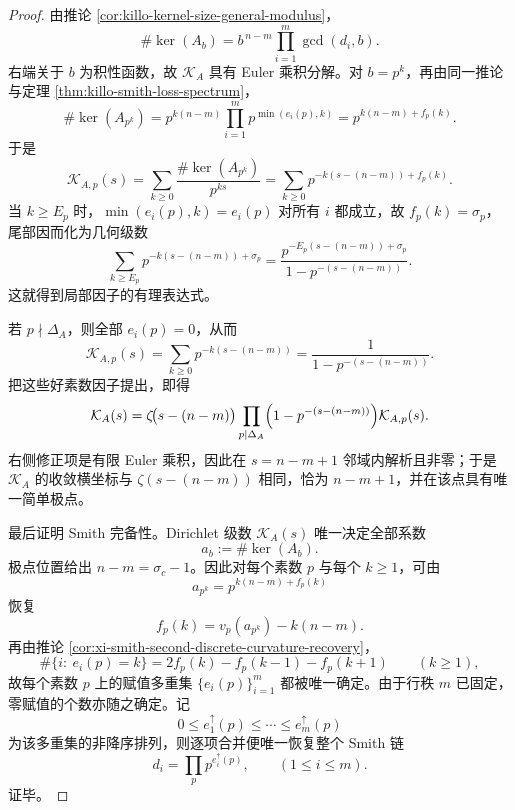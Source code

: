 \begin{proof}
由推论 \ref{cor:killo-kernel-size-general-modulus}，
\[
\#\ker(A_b)=b^{\,n-m}\prod_{i=1}^{m}\gcd(d_i,b).
\]
右端关于 \(b\) 为积性函数，故 \(\mathcal K_A\) 具有 Euler 乘积分解。对 \(b=p^k\)，再由同一推论与定理 \ref{thm:killo-smith-loss-spectrum}，
\[
\#\ker(A_{p^k})
=
p^{k(n-m)}\prod_{i=1}^{m}p^{\min(e_i(p),k)}
=
p^{k(n-m)+f_p(k)}.
\]
于是
\[
\mathcal K_{A,p}(s)
=
\sum_{k\ge 0}\frac{\#\ker(A_{p^k})}{p^{ks}}
=
\sum_{k\ge 0}p^{-k(s-(n-m))+f_p(k)}.
\]
当 \(k\ge E_p\) 时，\(\min(e_i(p),k)=e_i(p)\) 对所有 \(i\) 都成立，故 \(f_p(k)=\sigma_p\)，尾部因而化为几何级数
\[
\sum_{k\ge E_p}p^{-k(s-(n-m))+\sigma_p}
=
\frac{p^{-E_p(s-(n-m))+\sigma_p}}{1-p^{-(s-(n-m))}}.
\]
这就得到局部因子的有理表达式。

若 \(p\nmid \Delta_A\)，则全部 \(e_i(p)=0\)，从而
\[
\mathcal K_{A,p}(s)=\sum_{k\ge 0}p^{-k(s-(n-m))}
=
\frac{1}{1-p^{-(s-(n-m))}}.
\]
把这些好素数因子提出，即得
\[
\mathcal K_A(s)
=
\zeta\!\bigl(s-(n-m)\bigr)
\prod_{p\mid \Delta_A}
\Bigl(1-p^{-(s-(n-m))}\Bigr)\mathcal K_{A,p}(s).
\]
右侧修正项是有限 Euler 乘积，因此在 \(s=n-m+1\) 邻域内解析且非零；于是 \(\mathcal K_A\) 的收敛横坐标与 \(\zeta(s-(n-m))\) 相同，恰为 \(n-m+1\)，并在该点具有唯一简单极点。

最后证明 Smith 完备性。Dirichlet 级数 \(\mathcal K_A(s)\) 唯一决定全部系数
\[
a_b:=\#\ker(A_b).
\]
极点位置给出 \(n-m=\sigma_c-1\)。因此对每个素数 \(p\) 与每个 \(k\ge 1\)，可由
\[
a_{p^k}=p^{k(n-m)+f_p(k)}
\]
恢复
\[
f_p(k)=v_p(a_{p^k})-k(n-m).
\]
再由推论 \ref{cor:xi-smith-second-discrete-curvature-recovery}，
\[
\#\{i:\ e_i(p)=k\}
=
2f_p(k)-f_p(k-1)-f_p(k+1)
\qquad(k\ge 1),
\]
故每个素数 \(p\) 上的赋值多重集 \(\{e_i(p)\}_{i=1}^{m}\) 都被唯一确定。由于行秩 \(m\) 已固定，零赋值的个数亦随之确定。记
\[
0\le e_1^{\uparrow}(p)\le \cdots \le e_m^{\uparrow}(p)
\]
为该多重集的非降序排列，则逐项合并便唯一恢复整个 Smith 链
\[
d_i=\prod_p p^{e_i^{\uparrow}(p)},
\qquad(1\le i\le m).
\]
证毕。
\end{proof}

